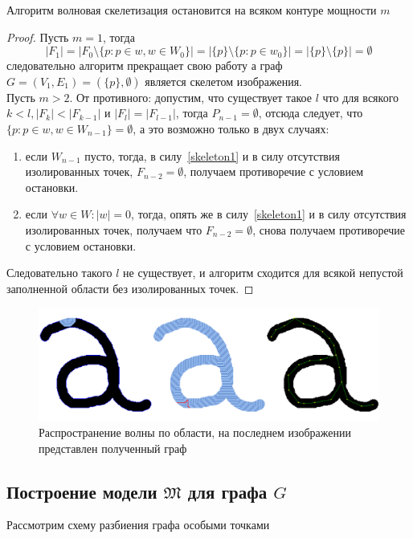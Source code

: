 \begin{state} 
Алгоритм волновая скелетизация остановится на всяком контуре мощности $m$
\label{WaveSkeletizationState}
\end{state}

\begin{proof}
Пусть $m=1$, тогда 
$$|F_1|=|F_0\setminus\{p:p\in w, w\in W_0\}| = |\{p\}\setminus\{p:p\in w_0\}|=|\{p\}\setminus\{p\}|=\emptyset$$
следовательно алгоритм прекращает свою работу а граф $G=(V_1,E_1)=(\{p\},\emptyset)$ является скелетом изображения.\\Пусть $m>2$. От противного: допустим, что существует такое $l$ что для всякого $k<l,|F_{k}| < |F_{k-1}|$ и $|F_{l}|=|F_{l-1}|$, тогда $P_{n-1}=\emptyset$, отсюда следует, что $\{p : p\in w, w \in W_{n-1}\}=\emptyset$, а это возможно только в двух случаях:\\
\begin{enumerate}
\item если $W_{n-1}$ пусто, тогда, в силу~\ref{skeleton1} и в силу отсутствия изолированных точек, $F_{n-2}=\emptyset$, получаем противоречие с условием остановки.\\
\item если $\forall w\in W:|w|=0$, тогда, опять же в силу~\ref{skeleton1} и в силу отсутствия изолированных точек, получаем что $F_{n-2}=\emptyset$, снова получаем противоречие с условием остановки.\\
\end{enumerate}
Следовательно такого $l$ не существует, и алгоритм сходится для всякой непустой заполненной области без изолированных точек.
\end{proof}
\begin{figure}[h]
\centering
\includegraphics[width=\linewidth,keepaspectratio]{images/th_wave_graph}
\caption{Распространение волны по области, на последнем изображении представлен полученный граф}
\end{figure}

\subsection{Построение модели  $\mathfrak{M}$ для графа $G$}
Рассмотрим схему разбиения графа особыми точками


